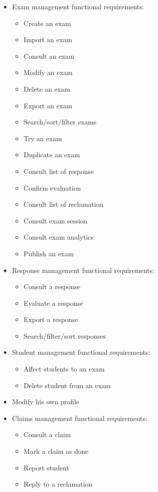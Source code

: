 \documentclass[a4paper,12p]{article}
\begin{document}
\begin{itemize}
        \item{Exam management functional requirements:}
        \begin{itemize}
            \item Create an exam
            \item Import an exam
            \item Consult an exam
            \item Modify an exam
            \item Delete an exam
            \item Export an exam
            \item Search/sort/filter exams
            \item Try an exam
            \item Duplicate an exam
            \item Consult list of response
            \item Confirm evaluation
            \item Consult list of reclamation
            \item Consult exam session
            \item Consult exam analytics
            \item Publish an exam
        \end{itemize}

        \item{Response management functional requirements:}
        \begin{itemize}
            \item Consult a response
            \item Evaluate a response
            \item Export a response
            \item Search/filter/sort responses
        \end{itemize}

        \item{Student management functional requirements:}
        \begin{itemize}
            \item Affect students to an exam
            \item Delete student from an exam
        \end{itemize}

        \item{Modify his own profile}

        \item{Claims management functional requirements:}
        \begin{itemize}
            \item Consult a claim
            \item Mark a claim as done
            \item Report student
            \item Reply to a reclamation
        \end{itemize}


\end{itemize}
\end{document}
